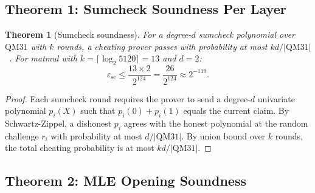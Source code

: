 \documentclass[10pt,twocolumn]{article}
\newtheorem{theorem}{Theorem}[section]
\theoremstyle{definition}
\theoremstyle{remark}
\newcommand{\QM}{\mathrm{QM31}}
\begin{document}
\subsection{Theorem 1: Sumcheck Soundness Per Layer}

\begin{theorem}[Sumcheck soundness]\label{thm:sumcheck}
  For a degree-$d$ sumcheck polynomial over $\QM$ with $k$ rounds,
  a cheating prover passes with probability at most
  $kd/|\QM|$~\cite{lund1992algebraic, schwartz1980, zippel1979}.
  For matmul with $k=\lceil\log_2 5120\rceil = 13$ and $d=2$:
  \[
    \varepsilon_{\text{sc}} \le \frac{13\times 2}{2^{124}}
    = \frac{26}{2^{124}} \approx 2^{-119}.
  \]
\end{theorem}

\begin{proof}
  Each sumcheck round requires the prover to send a degree-$d$
  univariate polynomial $p_i(X)$ such that $p_i(0)+p_i(1)$ equals
  the current claim.
  By Schwartz-Zippel, a dishonest $p_i$ agrees with the honest
  polynomial at the random challenge $r_i$ with probability at
  most $d/|\QM|$.
  By union bound over $k$ rounds, the total cheating probability
  is at most $kd/|\QM|$.
\end{proof}

\subsection{Theorem 2: MLE Opening Soundness}
\end{document}
